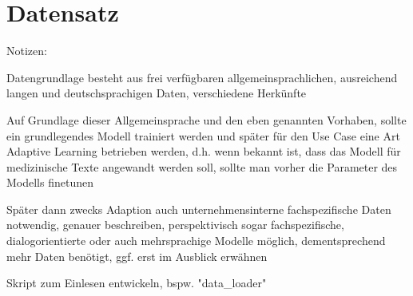 \section{Datensatz}
Notizen:
	\item Datengrundlage besteht aus frei verfügbaren allgemeinsprachlichen, ausreichend langen und deutschsprachigen Daten, verschiedene Herkünfte
	\item Auf Grundlage dieser Allgemeinsprache und den eben genannten Vorhaben, sollte ein grundlegendes Modell trainiert werden und später für den Use Case eine Art Adaptive Learning betrieben werden, d.h. wenn bekannt ist, dass das Modell für medizinische Texte angewandt werden soll, sollte man vorher die Parameter des Modells finetunen
	\item Später dann zwecks Adaption auch unternehmensinterne fachspezifische Daten notwendig, genauer beschreiben, perspektivisch sogar fachspezifische, dialogorientierte oder auch mehrsprachige Modelle möglich, dementsprechend mehr Daten benötigt, ggf. erst im Ausblick erwähnen
	\item Skript zum Einlesen entwickeln, bspw. "data_loader"
